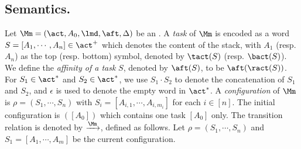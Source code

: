 \smallskip
\noindent \subsection*{Semantics.}
Let $ \Mm = (\act, A_0, \lmd, \aft, \Delta)$ be an {\AMASS}.
A \emph{task} of $\Mm$ is encoded as a word $S= [A_1, \cdots, A_n] \in \act^+$ which denotes the content of the stack, with $A_1$ (resp. $A_n$) as  the top (resp. bottom) symbol, denoted by $\tact(S)$ (resp. $\bact(S)$). We define the \emph{affinity of a task} $S$, denoted by $\aft(S)$, to be $\aft(\ract(S))$. For $S_1 \in \act^*$ and $S_2 \in \act^*$, we use $S_1 \cdot S_2$ to denote the concatenation of $S_1$ and $S_2$, and $\epsilon$ is used to denote the empty word in $\act^*$. 
A \emph{configuration} of $\Mm$ is $\rho=(S_1, \cdots, S_n)$
with $S_i = [A_{i,1}, \cdots, A_{i, m_i}]$ for each $i \in [n]$.
The initial configuration is $([A_0])$ which contains one task $[A_0]$ only. 
The transition relation is denoted by $\xrightarrow{\Mm}$, defined as follows.  %
Let $\rho = (S_1, \cdots, S_n)$ and $S_1 = [A_1,\cdots,A_m]$ be the current configuration. 

